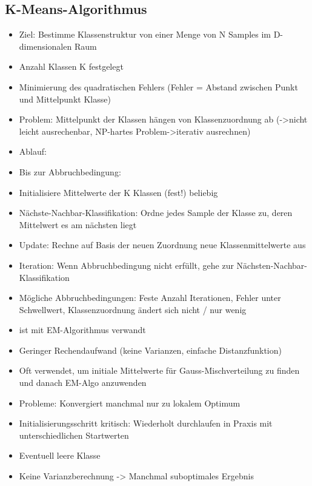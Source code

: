 \documentclass[a4paper,10pt,oneside]{article}
\begin{document}
\subsection{K-Means-Algorithmus}
\begin{itemize}
	\item Ziel: Bestimme Klassenstruktur von einer Menge von N Samples im D-dimensionalen Raum
	\item Anzahl Klassen K festgelegt
	\item Minimierung des quadratischen Fehlers (Fehler = Abstand zwischen Punkt und Mittelpunkt Klasse)
	\item Problem: Mittelpunkt der Klassen hängen von Klassenzuordnung ab (->nicht leicht ausrechenbar, NP-hartes Problem->iterativ ausrechnen)
	\item Ablauf:
	\item Bis zur Abbruchbedingung:
	\item Initialisiere Mittelwerte der K Klassen (fest!) beliebig
	\item Nächste-Nachbar-Klassifikation: Ordne jedes Sample der Klasse zu, deren Mittelwert es am nächsten liegt
	\item Update: Rechne auf Basis der neuen Zuordnung neue Klassenmittelwerte aus
	\item Iteration: Wenn Abbruchbedingung nicht erfüllt, gehe zur Nächsten-Nachbar-Klassifikation
	\item Mögliche Abbruchbedingungen: Feste Anzahl Iterationen, Fehler unter Schwellwert, Klassenzuordnung ändert sich nicht / nur wenig
	\item ist mit EM-Algorithmus verwandt
	\item Geringer Rechendaufwand (keine Varianzen, einfache Distanzfunktion)
	\item Oft verwendet, um initiale Mittelwerte für Gauss-Mischverteilung zu finden und danach EM-Algo anzuwenden
	\item Probleme: Konvergiert manchmal nur zu lokalem Optimum
	\item Initialisierungsschritt kritisch: Wiederholt durchlaufen in Praxis mit unterschiedlichen Startwerten
	\item Eventuell leere Klasse
	\item Keine Varianzberechnung -> Manchmal suboptimales Ergebnis
\end{itemize}
\end{document}
